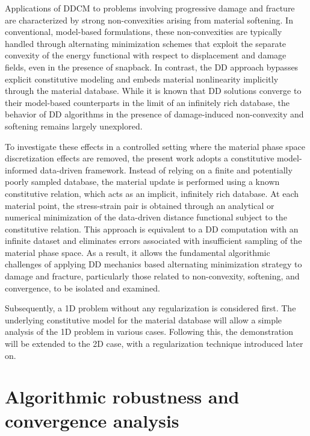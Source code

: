 \documentclass[10pt]{cas-sc}
\begin{document}
Applications of DDCM to problems involving progressive damage and fracture are characterized by strong non-convexities arising from material softening. In conventional, model-based formulations, these non-convexities are typically handled through alternating minimization schemes that exploit the separate convexity of the energy functional with respect to displacement and damage fields, even in the presence of snapback. In contrast, the DD approach bypasses explicit constitutive modeling and embeds material nonlinearity implicitly through the material database. While it is known that DD solutions converge to their model-based counterparts in the limit of an infinitely rich database, the behavior of DD algorithms in the presence of damage-induced non-convexity and softening remains largely unexplored.

To investigate these effects in a controlled setting where the material phase space discretization effects are removed, the present work adopts a constitutive model-informed data-driven framework. Instead of relying on a finite and potentially poorly sampled database, the material update is performed using a known constitutive relation, which acts as an implicit, infinitely rich database. At each material point, the stress-strain pair is obtained through an analytical or numerical minimization of the data-driven distance functional subject to the constitutive relation. This approach is equivalent to a DD computation with an infinite dataset and eliminates errors associated with insufficient sampling of the material phase space. As a result, it allows the fundamental algorithmic challenges of applying DD mechanics based alternating minimization strategy to damage and fracture, particularly those related to non-convexity, softening, and convergence, to be isolated and examined.

Subsequently, a 1D problem without any regularization is considered first. The underlying constitutive model for the material database will allow a simple analysis of the 1D problem in various cases. Following this, the demonstration will be extended to the 2D case, with a regularization technique introduced later on. 

\section{Algorithmic robustness and convergence analysis}
\end{document}
